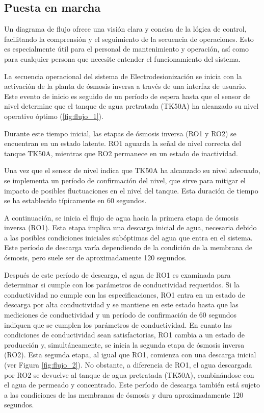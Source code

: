 \subsection{Puesta en marcha}
Un diagrama de flujo ofrece una visión clara y concisa de la lógica de control,
facilitando la comprensión y el seguimiento de la secuencia de operaciones.
Esto es especialmente útil para el personal de mantenimiento y operación,
así como para cualquier persona que necesite entender el funcionamiento del sistema.

La secuencia operacional del sistema de Electrodesionización se inicia con la activación de la planta de
ósmosis inversa a través de una interfaz de usuario. Este evento de inicio es seguido de un
período de espera hasta que el sensor de nivel determine que el tanque de agua pretratada (TK50A)
ha alcanzado su nivel operativo óptimo (\ref{fig:flujo_1}).

Durante este tiempo inicial, las etapas de ósmosis inversa (RO1 y RO2) se encuentran en un estado
latente. RO1 aguarda la señal de nivel correcta del tanque TK50A, mientras que RO2 permanece en un
estado de inactividad.

Una vez que el sensor de nivel indica que TK50A ha alcanzado su nivel adecuado, se implementa
un período de confirmación del nivel, que sirve para mitigar el impacto de posibles fluctuaciones
en el nivel del tanque. Esta duración de tiempo se ha establecido típicamente en 60 segundos.

A continuación, se inicia el flujo de agua hacia la primera etapa de ósmosis inversa (RO1). Esta
etapa implica una descarga inicial de agua, necesaria debido a las posibles condiciones iniciales
subóptimas del agua que entra en el sistema. Este período de descarga varía dependiendo de la condición
de la membrana de ósmosis, pero suele ser de aproximadamente 120 segundos.

Después de este período de descarga, el agua de RO1 es examinada para determinar si cumple con los
parámetros de conductividad requeridos. Si la conductividad no cumple con las especificaciones, RO1
entra en un estado de descarga por alta conductividad y se mantiene en este estado hasta que las
mediciones de conductividad y un período de confirmación de 60 segundos indiquen que se cumplen
los parámetros de conductividad.
En cuanto las condiciones de conductividad sean satisfactorias, RO1 cambia a un estado de producción
y, simultáneamente, se inicia la segunda etapa de ósmosis inversa (RO2). Esta segunda etapa, al
igual que RO1, comienza con una descarga inicial (ver Figura \ref{fig:flujo_2}). No obstante, a diferencia de RO1, el agua
descargada por RO2 se devuelve al tanque de agua pretratada (TK50A), combinándose con el agua
de permeado y concentrado. Este período de descarga también está sujeto a las condiciones de
las membranas de ósmosis y dura aproximadamente 120 segundos.

